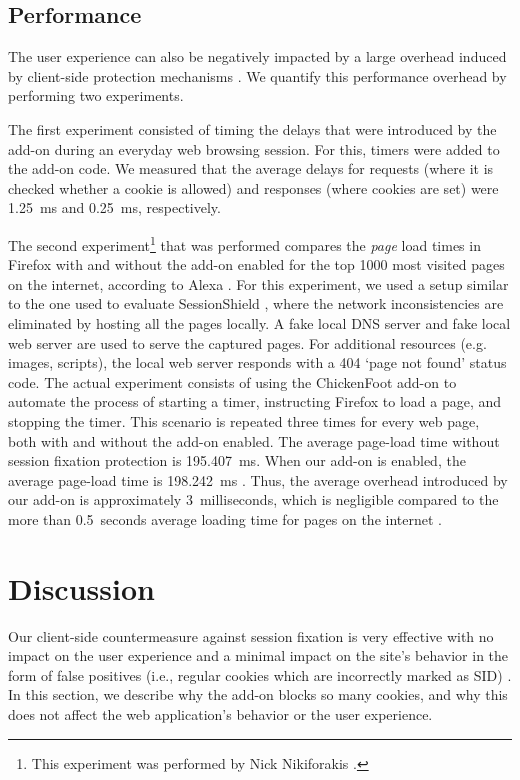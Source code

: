 \subsection{Performance}\label{performance}

The user experience can also be negatively impacted by a large overhead induced by client-side protection mechanisms \cite{Bonne2011}. We quantify this performance overhead by performing two experiments.

The first experiment consisted of timing the delays that were introduced by the add-on during an everyday web browsing session. For this, timers were added to the add-on code. We measured that the average delays for requests (where it is checked whether a cookie is allowed) and responses (where cookies are set) were 1.25\ ms and 0.25\ ms, respectively.

The second experiment\footnote{This experiment was performed by Nick Nikiforakis \cite{Bonne2011}.} that was performed compares the \emph{page} load times in Firefox with and without the add-on enabled for the top 1000 most visited pages on the internet, according to Alexa \cite{Alexa1000}. For this experiment, we used a setup similar to the one used to evaluate SessionShield \cite{Nikiforakis2010}, where the network inconsistencies are eliminated by hosting all the pages locally. A fake local DNS server and fake local web server are used to serve the captured pages. For additional resources (e.g. images, scripts), the local web server responds with a 404 `page not found' status code. The actual experiment consists of using the ChickenFoot add-on \cite{ChickenFoot} to automate the process of starting a timer, instructing Firefox to load a page, and stopping the timer. This scenario is repeated three times for every web page, both with and without the add-on enabled. The average page-load time without session fixation protection is 195.407\ ms. When our add-on is enabled, the average page-load time is 198.242\ ms \cite{Bonne2011}. Thus, the average overhead introduced by our add-on is approximately 3\ milliseconds, which is negligible compared to the more than 0.5\ seconds average loading time for pages on the internet \cite{Webmetrics}.

\section{Discussion}\label{discussion}

Our client-side countermeasure against session fixation is very effective with no impact on the user experience and a minimal impact on the site's behavior in the form of false positives (i.e., regular cookies which are incorrectly marked as SID) \cite{Bonne2011}. In this section, we describe why the add-on blocks so many cookies, and why this does not affect the web application's behavior or the user experience.


